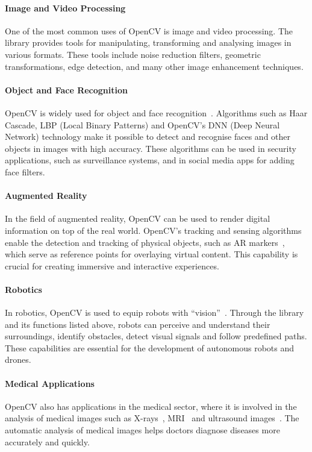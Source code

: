\paragraph{Image and Video Processing}
One of the most common uses of OpenCV is image and video processing.
The library provides tools for manipulating, transforming and analysing images in various formats.
These tools include noise reduction filters, geometric transformations, edge detection, and many other image enhancement techniques.

\paragraph{Object and Face Recognition}
OpenCV is widely used for object and face recognition~\cite{opencv-face-recognition-1, opencv-face-recognition-2, opencv-face-recognition-3}.
Algorithms such as Haar Cascade, LBP (Local Binary Patterns) and OpenCV's DNN (Deep Neural Network) technology make it
possible to detect and recognise faces and other objects in images with high accuracy.
These algorithms can be used in security applications, such as surveillance systems, and in social media apps for adding face filters.

\paragraph{Augmented Reality}
In the field of augmented reality, OpenCV can be used to render digital information on top of the real world.
OpenCV's tracking and sensing algorithms enable the detection and tracking of physical objects, such as AR
markers~\cite{opencv-marker-1, opencv-marker-2, opencv-marker-3}, which serve as reference points for overlaying virtual content.
This capability is crucial for creating immersive and interactive experiences.

\paragraph{Robotics}
In robotics, OpenCV is used to equip robots with ``vision''~\cite{opencv-robotics-1, opencv-robotics-2, opencv-robotics-3}.
Through the library and its functions listed above, robots can perceive and understand their surroundings,
identify obstacles, detect visual signals and follow predefined paths.
These capabilities are essential for the development of autonomous robots and drones.

\paragraph{Medical Applications}
OpenCV also has applications in the medical sector, where it is involved in the analysis of medical images such as
X-rays~\cite{opencv-x-ray}, MRI~\cite{opencv-mri-1, opencv-mri-2, opencv-mri-3}
and ultrasound images~\cite{opencv-ultrasound-1, opencv-ultrasound-2, opencv-ultrasound-3, opencv-ultrasound-4}.
The automatic analysis of medical images helps doctors diagnose diseases more accurately and quickly.
